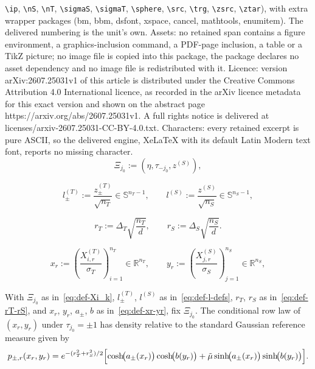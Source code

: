 \documentclass[10pt,a4paper]{amsart}
\newcommand{\DeltaS}{\Delta_{\src}}
\newcommand{\DeltaT}{\Delta_{\trg}}
\newcommand{\R}{\mathbb R}
\newcommand{\Xsrc}{X^{(\src)}}
\newcommand{\Xtar}{X^{(\trg)}}
\newcommand{\nS}{n_{\src}}
\newcommand{\nT}{n_{\trg}}
\newcommand{\sigmaS}{\sigma_{\src}}
\newcommand{\sigmaT}{\sigma_{\trg}}
\newcommand{\sphere}[1]{\mathbb S^{#1}}
\newcommand{\src}{S}
\newcommand{\trg}{T}
\newcommand{\zsrc}{z^{(\src)}}
\newcommand{\ztar}{z^{(\trg)}}
\begin{document}
\texttt{\textbackslash ip}, \texttt{\textbackslash nS}, \texttt{\textbackslash nT}, \texttt{\textbackslash sigmaS}, \texttt{\textbackslash sigmaT}, \texttt{\textbackslash sphere}, \texttt{\textbackslash src}, \texttt{\textbackslash trg}, \texttt{\textbackslash zsrc}, \texttt{\textbackslash ztar}), with extra wrapper packages (bm, bbm, dsfont, xspace, cancel, mathtools, enumitem). The delivered numbering is the unit's own. Assets: no retained span contains a figure environment, a graphics-inclusion command, a PDF-page inclusion, a table or a TikZ picture; no image file is copied into this package, the package declares no asset dependency and no image file is redistributed with it. Licence: version arXiv:2607.25031v1 of this article is distributed under the Creative Commons Attribution 4.0 International licence, as recorded in the arXiv licence metadata for this exact version and shown on the abstract page https://arxiv.org/abs/2607.25031v1. A full rights notice is delivered at licenses/arxiv-2607.25031-CC-BY-4.0.txt. Characters: every retained excerpt is pure ASCII, so the delivered engine, XeLaTeX with its default Latin Modern text font, reports no missing character.
\begin{equation}\label{eq:def-Xi_k}
    \Xi_{j_0} := (\eta,\tau_{-j_0},\zsrc),
\end{equation}

\begin{equation}\label{eq:def-l-defs}
    l^{(\trg)}_\pm := \frac{\ztar_\pm}{\sqrt{\nT}}\in\sphere{\nT-1},
    \qquad
    l^{(\src)} := \frac{\zsrc}{\sqrt{\nS}}\in\sphere{\nS-1},
\end{equation}

\begin{equation}\label{eq:def-rT-rS}
    r_T := \DeltaT\sqrt{\frac{\nT}{d}},
    \qquad
    r_S := \DeltaS\sqrt{\frac{\nS}{d}}.
\end{equation}

\begin{equation}\label{eq:def-xr-yr}
    x_r := \left(\frac{\Xtar_{i,r}}{\sigmaT}\right)_{i=1}^{\nT}\in\R^{\nT},
    \qquad
    y_r := \left(\frac{\Xsrc_{j,r}}{\sigmaS}\right)_{j=1}^{\nS}\in\R^{\nS},
\end{equation}

\begin{lemma}
\label{lem:sec3_product_row_density}
With $\Xi_{j_0}$ as in~\eqref{eq:def-Xi_k}, $l^{(\trg)}_\pm$, $l^{(\src)}$ as in~\eqref{eq:def-l-defs}, $r_T$, $r_S$ as in~\eqref{eq:def-rT-rS}, and $x_r$, $y_r$, $a_\pm$, $b$ as in~\eqref{eq:def-xr-yr}, fix $\Xi_{j_0}$.
The conditional row law of $(x_r,y_r)$ under $\tau_{j_0}=\pm1$
has density relative to the standard Gaussian reference measure given by
\begin{equation}
\label{eq:sec3_product_row_density}
    p_{\pm,r}(x_r,y_r)
    =
    e^{-(r_T^2+r_S^2)/2}\Bigl[
        \cosh\!\bigl(a_\pm(x_r)\bigr)\cosh\!\bigl(b(y_r)\bigr)
        + \tilde\mu\sinh\!\bigl(a_\pm(x_r)\bigr)\sinh\!\bigl(b(y_r)\bigr)
    \Bigr].
\end{equation}
\end{lemma}
\end{document}
